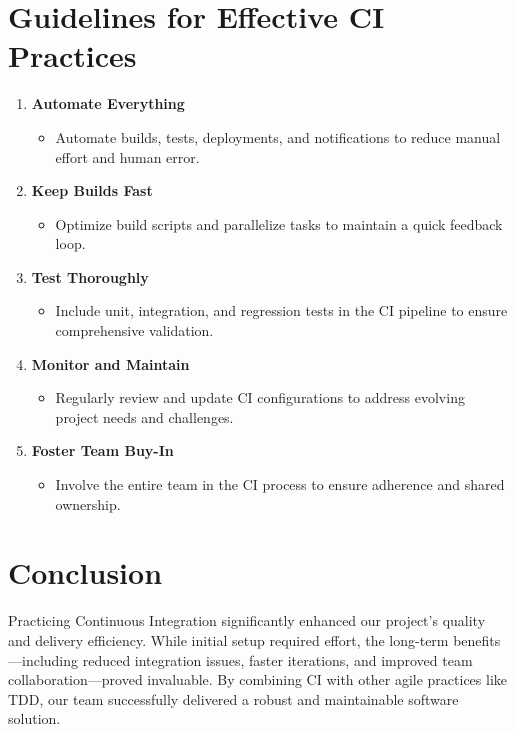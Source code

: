 \documentclass[a4paper,12pt]{article}
\begin{document}
\section{Guidelines for Effective CI Practices}
\begin{enumerate}
    \item \textbf{Automate Everything}
        \begin{itemize}
            \item Automate builds, tests, deployments, and notifications to reduce manual effort and human
                error.
\end{itemize}
\item \textbf{Keep Builds Fast}
    \begin{itemize}
        \item Optimize build scripts and parallelize tasks to maintain a quick feedback loop.
\end{itemize}
\item \textbf{Test Thoroughly}
    \begin{itemize}
        \item Include unit, integration, and regression tests in the CI pipeline to ensure comprehensive
            validation.
\end{itemize}
\item \textbf{Monitor and Maintain}
    \begin{itemize}
        \item Regularly review and update CI configurations to address evolving project needs and challenges.
\end{itemize}
\item \textbf{Foster Team Buy-In}
    \begin{itemize}
        \item Involve the entire team in the CI process to ensure adherence and shared ownership.
\end{itemize}
\end{enumerate}
\section{Conclusion}
Practicing Continuous Integration significantly enhanced our project’s quality and delivery efficiency. While
initial setup required effort, the long-term benefits—including reduced integration issues, faster iterations,
and improved team collaboration—proved invaluable. By combining CI with other agile practices like TDD, our
team successfully delivered a robust and maintainable software solution.
\end{document}

